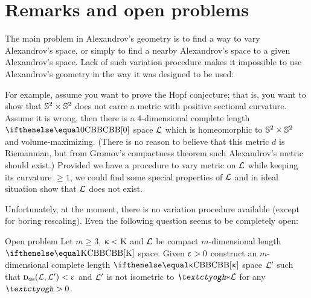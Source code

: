 \chapter{Remarks and open problems}

The main problem in Alexandrov's geometry is to find a way to vary Alexandrov's
space, or simply to find a nearby Alexandrov's space to a given Alexandrov's
space. 
Lack of such variation procedure makes it impossible to use Alexandrov's
geometry in the way it was designed to be used: 

For example, 
assume you want to prove the Hopf conjecture;
that is, you want to show that $\SS^2\times \SS^2$ does not carre a metric with positive sectional curvature. 
Assume it is wrong, then there is a 4-dimensional complete length $\Alex0$ space $\mathcal{L}$ which is homeomorphic to $\SS^2\times \SS^2$ and volume-maximizing.
(There is no reason to believe
that this metric $d$ is Riemannian, but from Gromov's compactness theorem such
Alexandrov's metric should exist.) 
Provided we have a procedure to vary metric on $\mathcal{L}$ while keeping its curvature $\ge 1$,
we could find some special properties of $\mathcal{L}$  and in ideal situation show that
$\mathcal{L}$ does not exist.

Unfortunately, at the moment, there is no variation procedure available (except for boring rescaling). 
Even the following question seems to be completely open:

\begin{thm}{Open problem}\label{open:varray}
Let
$m\ge 3$, 
$\upkappa<\mathrm{K}$ 
and $\mathcal{L}$ be compact $m$-dimensional length $\Alex\Kappa$ space.
Given $\upvarepsilon>0$ construct an $m$-dimensional complete length $\Alex\kappa$ space $\mathcal{L}'$
such that $\text{\sc d}_{\text{\sf\tiny GH}}(\mathcal{L},\mathcal{L}')<\upvarepsilon$ 
and $\mathcal{L}'$ is not isometric to $\lam\blow\spc{L}$ for any $\lam>0$.
\end{thm}
